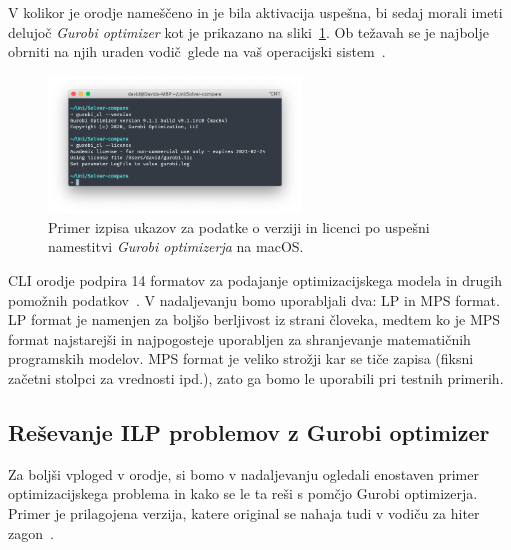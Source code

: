 \documentclass[a4paper,11pt]{article}
\begin{document}
V kolikor je orodje nameščeno in je bila aktivacija uspešna, bi sedaj morali imeti delujoč \textit{Gurobi optimizer} kot je prikazano na sliki~\ref{img:gurobi_license}. Ob težavah se je najbolje obrniti na njih uraden vodič~glede na vaš operacijski sistem~\cite{GurobiQuickstart:2020}.
\begin{figure}[htpb] \centering
	\includegraphics[width=0.6\textwidth]{images/gurobi_license.png}
	\caption{Primer izpisa ukazov za podatke o verziji in licenci po uspešni namestitvi \textit{Gurobi optimizerja} na macOS.}
	\label{img:gurobi_license}
\end{figure}
CLI orodje podpira 14 formatov za podajanje optimizacijskega modela in drugih pomožnih podatkov~\cite{GurobiFormats:2020}. V nadaljevanju bomo uporabljali dva: LP in MPS format. LP format je namenjen za boljšo berljivost iz strani človeka, medtem ko je MPS format najstarejši in najpogosteje uporabljen za shranjevanje matematičnih programskih modelov. MPS format je veliko strožji kar se tiče zapisa (fiksni začetni stolpci za vrednosti ipd.), zato ga bomo le uporabili pri testnih primerih.

\subsection{Reševanje ILP problemov z Gurobi optimizer}

Za boljši vploged v orodje, si bomo v nadaljevanju ogledali enostaven primer optimizacijskega problema in kako se le ta reši s pomčjo Gurobi optimizerja. Primer je prilagojena verzija, katere original se nahaja tudi v vodiču za hiter zagon~\cite{GurobiQuickstart:2020}. 
\end{document}
